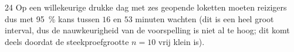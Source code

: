 \begin{question}{24}
{        Op een willekeurige drukke dag met zes geopende loketten moeten reizigers dus met \SI{95}{\percent} kans tussen
        $16$ en $53$ minuten wachten (dit is een heel groot interval, dus de nauwkeurigheid van de voorspelling is niet al te hoog;
        dit komt deels doordat de steekproefgrootte $n=10$ vrij klein is). 
    }
\end{question}